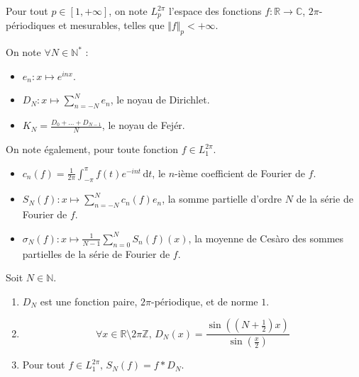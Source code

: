 





  \begin{notation}
    Pour tout $p \in [1, +\infty]$, on note $L_p^{2\pi}$ l'espace des fonctions $f : \mathbb{R} \rightarrow \mathbb{C}$, $2\pi$-périodiques et mesurables, telles que $\Vert f \Vert_p < +\infty$.
  \end{notation}

  \begin{notation}
    On note $\forall N \in \mathbb{N}^*$ :
    \begin{itemize}
      \item $e_n : x \mapsto e^{inx}$.
      \item $D_N : x \mapsto \sum_{n=-N}^N e_n$, le noyau de Dirichlet.
      \item $K_N = \frac{D_0 + \dots + D_{N-1}}{N}$, le noyau de Fejér.
    \end{itemize}
  \end{notation}

  \begin{notation}
    On note également, pour toute fonction $f \in L_1^{2\pi}$.
    \begin{itemize}
      \item $c_n(f) = \frac{1}{2\pi} \int_{- \pi}^\pi f(t) e^{-int} \, \mathrm{d}t$, le $n$-ième coefficient de Fourier de $f$.
      \item $S_N(f) : x \mapsto \sum_{n=-N}^N c_n(f) e_n$, la somme partielle d'ordre $N$ de la série de Fourier de $f$.
      \item $\sigma_N(f) : x \mapsto \frac{1}{N - 1} \sum_{n=0}^N S_n(f)(x)$, la moyenne de Cesàro des sommes partielles de la série de Fourier de $f$.
    \end{itemize}
  \end{notation}


  \begin{lemma}
    \label{theoreme-de-fejer-1}
    Soit $N \in \mathbb{N}$.
    \begin{enumerate}[label=(\roman*)]
      \item $D_N$ est une fonction paire, $2\pi$-périodique, et de norme $1$.
      \item \[ \forall x \in \mathbb{R} \setminus 2 \pi \mathbb{Z}, \, D_N(x) = \frac{\sin \left(\left( N + \frac{1}{2} \right) x \right)}{\sin \left( \frac{x}{2} \right)} \]
      \item Pour tout $f \in L_1^{2 \pi}, \, S_N(f) = f * D_N$.
    \end{enumerate}
  \end{lemma}


